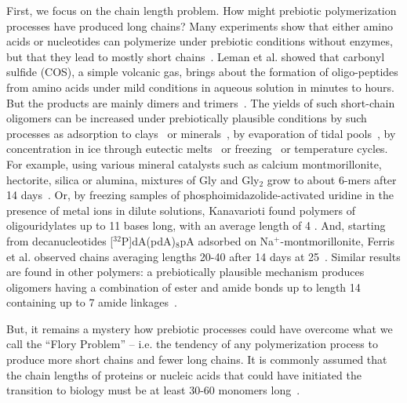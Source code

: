 \documentclass[journal=jacsat,manuscript=article,layout=twocolumn]{achemso}
\begin{document}
First, we focus on the chain length problem.  How might prebiotic polymerization processes have 
produced long chains?  Many experiments show that either amino acids or nucleotides can polymerize 
under prebiotic conditions without enzymes, but that they lead to mostly short 
chains~\cite{Shock1992,Martin1998,PAECHT-HOROWITZ1970,Leman2004a,Orgel2004}.  Leman et al. showed 
that carbonyl sulfide (COS), a simple volcanic gas, brings about the formation of oligo-peptides 
from amino acids under mild conditions in aqueous solution in minutes to hours. But the products are 
mainly dimers and trimers~\cite{Leman2004a}.  The yields of such short-chain oligomers can be 
increased under prebiotically plausible conditions by such processes as adsorption to 
clays~\cite{Rao1980,Lambert2008} or minerals~\cite{Bernal1949,Ferris1996}, by evaporation of tidal 
pools~\cite{Nelson2001}, by concentration in ice through eutectic melts~\cite{Kanavarioti2001} or 
freezing~\cite{Bada2004} or temperature cycles.  For example, using various mineral catalysts such 
as calcium montmorillonite, hectorite, silica or alumina, mixtures of Gly and Gly$_2$ grow to about 
6-mers after 14 days~\cite{Rode1997,Rode1999}.  Or, by freezing samples of 
phosphoimidazolide-activated uridine in the presence of metal ions in dilute solutions, Kanavarioti 
found polymers of oligouridylates up to 11 bases long, with an average length of 4 
\cite{Kanavarioti2001}.  And, starting from decanucleotides [$^{32}$P]dA(pdA)$_8$pA adsorbed on 
Na$^+$-montmorillonite, Ferris et al. observed chains averaging lengths 20-40 after 14 days at 
25\textcelsius\ \cite{Ferris1996}.  Similar results are found in other polymers: a prebiotically 
plausible mechanism produces oligomers having a combination of ester and amide bonds up to length 14 
containing up to 7 amide linkages~\cite{Forsythe2015}.  

 But, it remains a mystery how prebiotic processes could have overcome what we call the ``Flory 
Problem'' -- i.e. the tendency of any polymerization process to produce more short chains and fewer 
long chains.  It is commonly assumed that the chain lengths of proteins or nucleic acids that could 
have initiated the transition to biology must be at least 30-60 monomers long~\cite{Szostak1993}.  
 
\end{document}
